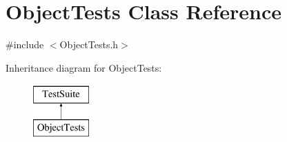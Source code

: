 \hypertarget{classObjectTests}{\section{Object\-Tests Class Reference}
\label{classObjectTests}
}


{\ttfamily \#include $<$Object\-Tests.\-h$>$}

Inheritance diagram for Object\-Tests\-:\begin{figure}[H]
\begin{center}
\leavevmode
\includegraphics[height=2.000000cm]{classObjectTests}
\end{center}
\end{figure}
